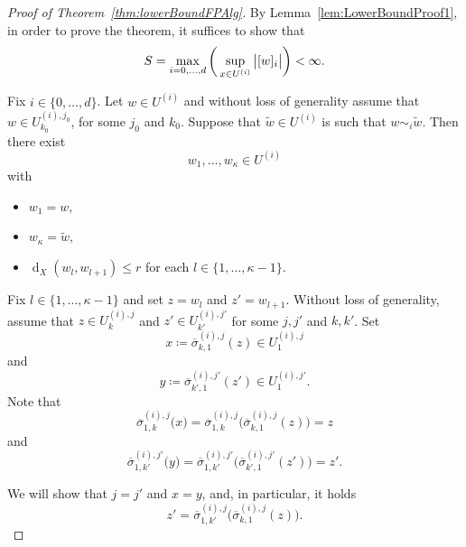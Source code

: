 \documentclass[a4paper]{amsart}
\numberwithin{equation}{section}
\newcommand{\prn}[1]{{(#1)}}
\DeclareMathOperator{\dist}{d}
\newcommand{\distX}[2]{{\dist_X ( #1, #2 )}}
\theoremstyle{plain}
\theoremstyle{indented}
\numberwithin{equation}{section}
\theoremstyle{definition}
\theoremstyle{remark}
\theoremstyle{plain}
\theoremstyle{definition}
\begin{document}
    \begin{proof}[Proof of Theorem~\ref{thm:lowerBoundFPAlg}]
    By Lemma~\ref{lem:LowerBoundProof1}, in order to prove the theorem, it suffices to show that 
     \begin{equation*}
        S = \max_{i=0,\hdots,d} \bigg(\sup_{x \in U^{(i)}} \big{\lvert}{ [ w ]_{i}} \big{\rvert} \bigg) < \infty .
    \end{equation*}

        Fix ${i \in \{0,\hdots, d\}}$.
      Let ${w \in U^{\prn{i}}}$ and without loss of generality assume that ${w \in U^{(i),j_0}_{k_0}}$,
      for some ${j_0}$ and ${k_0}$. 
        Suppose that ${\widetilde{w} \in U^{\prn{i}}}$ is such that ${w \sim_i \widetilde{w}}$. 
        Then there exist 
        \[{w_1, \hdots, w_\kappa \in U^{\prn{i}}}\]
        with 
    \begin{itemize}
        \item $w_1 = w,$
        \item $w_\kappa = \widetilde{w},$
        \item ${\distX{w_l}{w_{l+1}} \le r}$ for each ${l \in \{1,\hdots,\kappa-1\}}$.
    \end{itemize}

    Fix ${l \in \{1,\hdots,\kappa-1\}}$ and set 
    ${z=w_l}$ and ${z'=w_{l+1}}$. 
    Without loss of generality, assume that
    ${z \in U^{(i),j}_k}$ and ${z' \in U^{(i),j'}_{k'}}$ for some  ${j, j'}$ and ${k, k'}$. 
        Set 
        \begin{equation*}
            x \coloneq {{\overline{\sigma}}_{k,1}^{(i),j}}(z)  \in U^{(i),j}_1 
        \end{equation*}
        and
        \begin{equation*}
        y \coloneq {\overline{\sigma}_{k',1}^{(i),j'}}(z')  \in U^{(i),j'}_1.
        \end{equation*}
       Note that
        \[{{\overline{\sigma}}_{1,k}^{(i),j}} \big(x \big) = {{\overline{\sigma}}_{1,k}^{(i),j}} \big({{\overline{\sigma}}_{k,1}^{(i),j}}(z) \big) = z\]
        and
        \[{\overline{\sigma}_{1,k'}^{(i),j'}}\big(y \big) = {\overline{\sigma}_{1,k'}^{(i),j'}}\big({\overline{\sigma}_{k',1}^{(i),j'}}(z') \big)
        = z'. \]
        
        We will show that 
        $j = j'$ and $x=y$, and, in particular, it holds
        \begin{equation*}
            z' = {\overline{\sigma}_{1,k'}^{(i),j}}\big({{\overline{\sigma}}_{k,1}^{(i),j}}(z) \big).
        \end{equation*}


\end{proof}
\end{document}
